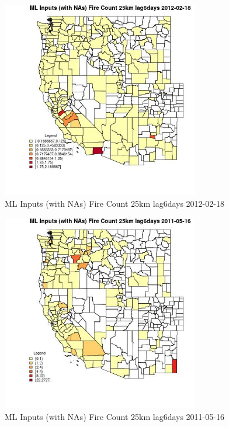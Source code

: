 \begin{figure} 
\centering  
\includegraphics[width=0.77\textwidth]{Code_Outputs/Report_ML_input_PM25_Step4_part_f_de_duplicated_aveswNAs_CountyFire_Count_25km_lag6daysMean2012-02-18.jpg} 
\caption{\label{fig:Report_ML_input_PM25_Step4_part_f_de_duplicated_aveswNAsCountyFire_Count_25km_lag6daysMean2012-02-18}ML Inputs (with NAs) Fire Count 25km lag6days 2012-02-18} 
\end{figure} 
 

\begin{figure} 
\centering  
\includegraphics[width=0.77\textwidth]{Code_Outputs/Report_ML_input_PM25_Step4_part_f_de_duplicated_aveswNAs_CountyFire_Count_25km_lag6daysMean2011-05-16.jpg} 
\caption{\label{fig:Report_ML_input_PM25_Step4_part_f_de_duplicated_aveswNAsCountyFire_Count_25km_lag6daysMean2011-05-16}ML Inputs (with NAs) Fire Count 25km lag6days 2011-05-16} 
\end{figure} 
 

